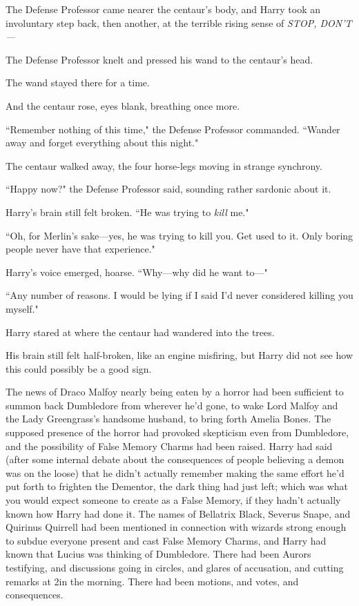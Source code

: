 The Defense Professor came nearer the centaur's body, and Harry took an involuntary step back, then another, at the terrible rising sense of \emph{STOP, DON'T---}

The Defense Professor knelt and pressed his wand to the centaur's head.

The wand stayed there for a time.

And the centaur rose, eyes blank, breathing once more.

``Remember nothing of this time," the Defense Professor commanded. ``Wander away and forget everything about this night."

The centaur walked away, the four horse-legs moving in strange synchrony.

``Happy now?" the Defense Professor said, sounding rather sardonic about it.

Harry's brain still felt broken. ``He was trying to \emph{kill} me."

``Oh, for Merlin's sake---yes, he was trying to kill you. Get used to it. Only boring people never have that experience."

Harry's voice emerged, hoarse. ``Why---why did he want to---"

``Any number of reasons. I would be lying if I said I'd never considered killing you myself."

Harry stared at where the centaur had wandered into the trees.

His brain still felt half-broken, like an engine misfiring, but Harry did not see how this could possibly be a good sign.

\later

The news of Draco Malfoy nearly being eaten by a horror had been sufficient to summon back Dumbledore from wherever he'd gone, to wake Lord Malfoy and the Lady Greengrass's handsome husband, to bring forth Amelia Bones. The supposed presence of the horror had provoked skepticism even from Dumbledore, and the possibility of False Memory Charms had been raised. Harry had said (after some internal debate about the consequences of people believing a demon was on the loose) that he didn't actually remember making the same effort he'd put forth to frighten the Dementor, the dark thing had just left; which was what you would expect someone to create as a False Memory, if they hadn't actually known how Harry had done it. The names of Bellatrix Black, Severus Snape, and Quirinus Quirrell had been mentioned in connection with wizards strong enough to subdue everyone present and cast False Memory Charms, and Harry had known that Lucius was thinking of Dumbledore. There had been Aurors testifying, and discussions going in circles, and glares of accusation, and cutting remarks at 2\am in the morning. There had been motions, and votes, and consequences.

